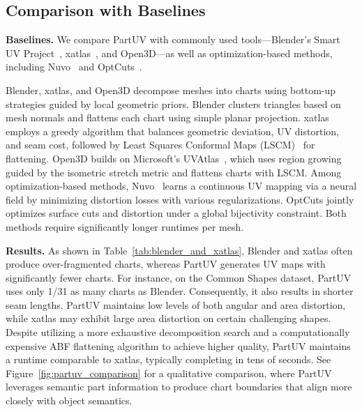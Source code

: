 \subsection{Comparison with Baselines}

\noindent \textbf{\textbf{Baselines.}}
We compare PartUV with commonly used tools—Blender’s Smart UV Project~\cite{blender}, xatlas~\cite{xatlas}, and Open3D—as well as optimization-based methods, including Nuvo~\cite{srinivasan2024nuvo} and OptCuts~\cite{li2018optcuts}.

Blender, xatlas, and Open3D decompose meshes into charts using bottom-up strategies guided by local geometric priors. Blender clusters triangles based on mesh normals and flattens each chart using simple planar projection. xatlas employs a greedy algorithm that balances geometric deviation, UV distortion, and seam cost, followed by Least Squares Conformal Maps (LSCM)~\cite{lscm} for flattening. Open3D builds on Microsoft’s UVAtlas~\cite{UVAtlas,zhou2004iso,sander2002signal}, which uses region growing guided by the isometric stretch metric and flattens charts with LSCM. Among optimization-based methods, Nuvo~\cite{srinivasan2024nuvo} learns a continuous UV mapping via a neural field by minimizing distortion losses with various regularizations. OptCuts jointly optimizes surface cuts and distortion under a global bijectivity constraint. Both methods require significantly longer runtimes per mesh.





\noindent \textbf{Results.}
As shown in Table~\ref{tab:blender_and_xatlas}, Blender and xatlas often produce over-fragmented charts, whereas PartUV generates UV maps with significantly fewer charts. For instance, on the Common Shapes dataset, PartUV uses only 1/31 as many charts as Blender. Consequently, it also results in shorter seam lengths. PartUV maintains low levels of both angular and area distortion, while xatlas may exhibit large area distortion on certain challenging shapes. Despite utilizing a more exhaustive decomposition search and a computationally expensive ABF flattening algorithm to achieve higher quality, PartUV maintains a runtime comparable to xatlas, typically completing in tens of seconds. See Figure~\ref{fig:partuv_comparison} for a qualitative comparison, where PartUV leverages semantic part information to produce chart boundaries that align more closely with object semantics.

